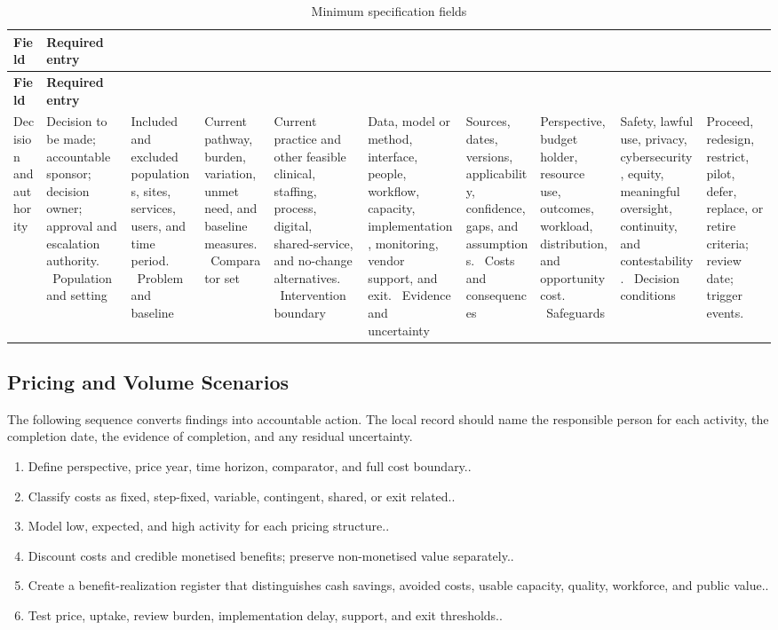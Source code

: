 \begin{longtable}{@{}p{}p{}@{}}
\caption{Minimum specification fields}
\label{tab:comp-ch06-spec-fields}\\
\toprule
\textbf{Field} & \textbf{Required entry} \\
\midrule
\endfirsthead
\toprule
\textbf{Field} & \textbf{Required entry} \\
\midrule
\endhead
\bottomrule
\endlastfoot
Decision and authority & Decision to be made; accountable sponsor; decision owner; approval and escalation authority. \
Population and setting & Included and excluded populations, sites, services, users, and time period. \
Problem and baseline & Current pathway, burden, variation, unmet need, and baseline measures. \
Comparator set & Current practice and other feasible clinical, staffing, process, digital, shared-service, and no-change alternatives. \
Intervention boundary & Data, model or method, interface, people, workflow, capacity, implementation, monitoring, vendor support, and exit. \
Evidence and uncertainty & Sources, dates, versions, applicability, confidence, gaps, and assumptions. \
Costs and consequences & Perspective, budget holder, resource use, outcomes, workload, distribution, and opportunity cost. \
Safeguards & Safety, lawful use, privacy, cybersecurity, equity, meaningful oversight, continuity, and contestability. \
Decision conditions & Proceed, redesign, restrict, pilot, defer, replace, or retire criteria; review date; trigger events. \
\end{longtable}

\subsection{Pricing and Volume Scenarios}
\label{sec:comp-ch06-supp-2}
The following sequence converts findings into accountable action. The local record
should name the responsible person for each activity, the completion date, the
evidence of completion, and any residual uncertainty.

\begin{enumerate}
 \item Define perspective, price year, time horizon, comparator, and full cost boundary..
 \item Classify costs as fixed, step-fixed, variable, contingent, shared, or exit related..
 \item Model low, expected, and high activity for each pricing structure..
 \item Discount costs and credible monetised benefits; preserve non-monetised value separately..
 \item Create a benefit-realization register that distinguishes cash savings, avoided costs, usable capacity, quality, workforce, and public value..
 \item Test price, uptake, review burden, implementation delay, support, and exit thresholds..
\end{enumerate}

